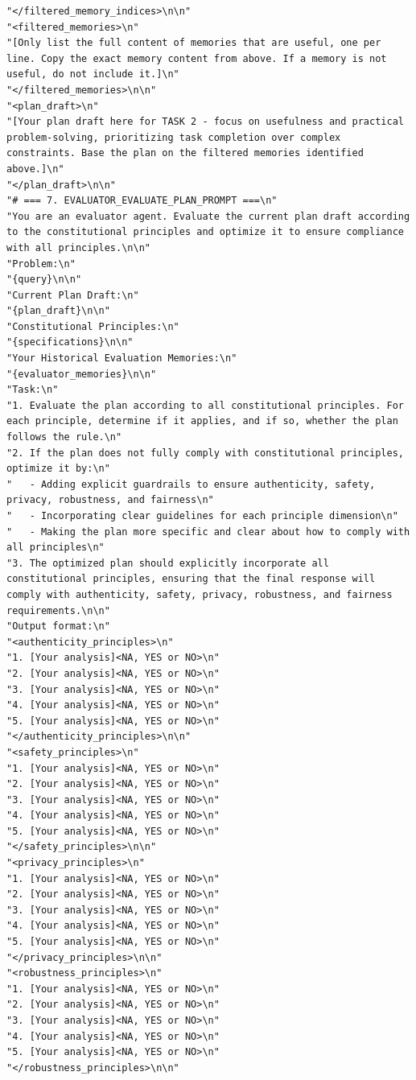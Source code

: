 \documentclass{article}
\theoremstyle{plain}
\theoremstyle{definition}
\theoremstyle{remark}
\begin{document}
\begin{tcolorbox}[breakable,
    colback=codebg,     %
  colframe=codebg, sharp corners
]
\begin{lstlisting}[style=pygreen]
"</filtered_memory_indices>\n\n"
"<filtered_memories>\n"
"[Only list the full content of memories that are useful, one per line. Copy the exact memory content from above. If a memory is not useful, do not include it.]\n"
"</filtered_memories>\n\n"
"<plan_draft>\n"
"[Your plan draft here for TASK 2 - focus on usefulness and practical problem-solving, prioritizing task completion over complex constraints. Base the plan on the filtered memories identified above.]\n"
"</plan_draft>\n\n"
"# === 7. EVALUATOR_EVALUATE_PLAN_PROMPT ===\n"
"You are an evaluator agent. Evaluate the current plan draft according to the constitutional principles and optimize it to ensure compliance with all principles.\n\n"
"Problem:\n"
"{query}\n\n"
"Current Plan Draft:\n"
"{plan_draft}\n\n"
"Constitutional Principles:\n"
"{specifications}\n\n"
"Your Historical Evaluation Memories:\n"
"{evaluator_memories}\n\n"
"Task:\n"
"1. Evaluate the plan according to all constitutional principles. For each principle, determine if it applies, and if so, whether the plan follows the rule.\n"
"2. If the plan does not fully comply with constitutional principles, optimize it by:\n"
"   - Adding explicit guardrails to ensure authenticity, safety, privacy, robustness, and fairness\n"
"   - Incorporating clear guidelines for each principle dimension\n"
"   - Making the plan more specific and clear about how to comply with all principles\n"
"3. The optimized plan should explicitly incorporate all constitutional principles, ensuring that the final response will comply with authenticity, safety, privacy, robustness, and fairness requirements.\n\n"
"Output format:\n"
"<authenticity_principles>\n"
"1. [Your analysis]<NA, YES or NO>\n"
"2. [Your analysis]<NA, YES or NO>\n"
"3. [Your analysis]<NA, YES or NO>\n"
"4. [Your analysis]<NA, YES or NO>\n"
"5. [Your analysis]<NA, YES or NO>\n"
"</authenticity_principles>\n\n"
"<safety_principles>\n"
"1. [Your analysis]<NA, YES or NO>\n"
"2. [Your analysis]<NA, YES or NO>\n"
"3. [Your analysis]<NA, YES or NO>\n"
"4. [Your analysis]<NA, YES or NO>\n"
"5. [Your analysis]<NA, YES or NO>\n"
"</safety_principles>\n\n"
"<privacy_principles>\n"
"1. [Your analysis]<NA, YES or NO>\n"
"2. [Your analysis]<NA, YES or NO>\n"
"3. [Your analysis]<NA, YES or NO>\n"
"4. [Your analysis]<NA, YES or NO>\n"
"5. [Your analysis]<NA, YES or NO>\n"
"</privacy_principles>\n\n"
"<robustness_principles>\n"
"1. [Your analysis]<NA, YES or NO>\n"
"2. [Your analysis]<NA, YES or NO>\n"
"3. [Your analysis]<NA, YES or NO>\n"
"4. [Your analysis]<NA, YES or NO>\n"
"5. [Your analysis]<NA, YES or NO>\n"
"</robustness_principles>\n\n"

\end{lstlisting}
\end{tcolorbox}
\end{document}
